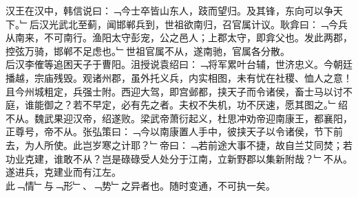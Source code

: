 汉王在汉中，韩信说曰：﹁今士卒皆山东人，跂而望归。及其锋，东向可以争天下。﹂后汉光武北至蓟，闻邯郸兵到，世祖欲南归，召官属计议。耿弇曰：﹁今兵从南来，不可南行。渔阳太守彭宠，公之邑人；上郡太守，即弇父也。发此两郡，控弦万骑，邯郸不足虑也。﹂世祖官属不从，遂南驰，官属各分散。\\
后汉李傕等追困天子于曹阳。沮授说袁绍曰：﹁将军累叶台辅，世济忠义。今朝廷播越，宗庙残毁。观诸州郡，虽外托义兵，内实相图，未有忧在社稷、恤人之意！且今州城粗定，兵强士附。西迎大驾，即宫邺都，挟天子而令诸侯，畜士马以讨不庭，谁能御之？若不早定，必有先之者。夫权不失机，功不厌速，愿其图之。﹂绍不从。魏武果迎汉帝，绍遂败。梁武帝萧衍起义，杜思冲劝帝迎南康王，都襄阳，正尊号，帝不从。张弘策曰：﹁今以南康置人手中，彼挟天子以令诸侯，节下前去，为人所使。此岂岁寒之计耶？﹂帝曰：﹁若前途大事不捷，故自兰艾同焚；若功业克建，谁敢不从？岂是碌碌受人处分于江南，立新野郡以集新附哉？﹂不从。遂进兵，克建业而有江左。
\\
此﹁情﹂与﹁形﹂、﹁势﹂之异者也。随时变通，不可执一矣。
\\%
%
